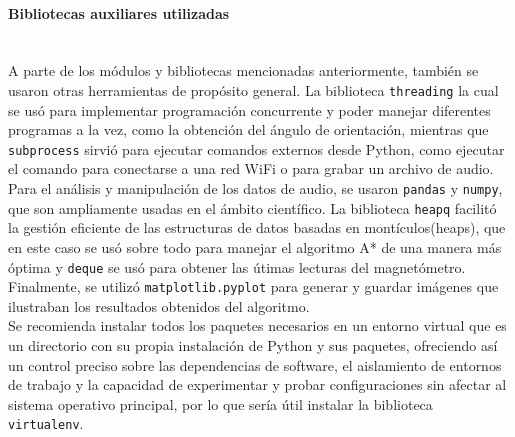 \paragraph{Bibliotecas auxiliares utilizadas} \hspace{0pt} \\

A parte de los módulos y bibliotecas mencionadas anteriormente, también se usaron otras herramientas de propósito general. La biblioteca \texttt{threading} la cual se usó para implementar programación concurrente y poder manejar diferentes programas a la vez, como la obtención del ángulo de orientación, mientras que \texttt{subprocess} sirvió para ejecutar comandos externos desde Python, como ejecutar el comando para conectarse a una red WiFi o para grabar un archivo de audio. Para el análisis y manipulación de los datos de audio, se usaron \texttt{pandas} y \texttt{numpy}, que son ampliamente usadas en el ámbito científico. La biblioteca \texttt{heapq} facilitó la gestión eficiente de las estructuras de datos basadas en montículos(heaps), que en este caso se usó sobre todo para manejar el algoritmo A* de una manera más óptima y \texttt{deque} se usó para obtener las útimas lecturas del magnetómetro. Finalmente, se utilizó \texttt{matplotlib.pyplot} para generar y guardar imágenes que ilustraban los resultados obtenidos del algoritmo.\\

Se recomienda instalar todos los paquetes necesarios en un entorno virtual que es un directorio con su propia instalación de Python y sus paquetes, ofreciendo así un control preciso sobre las dependencias de software, el aislamiento de entornos de trabajo y la capacidad de experimentar y probar configuraciones sin afectar al sistema operativo principal, por lo que sería útil instalar la biblioteca \texttt{virtualenv}.


